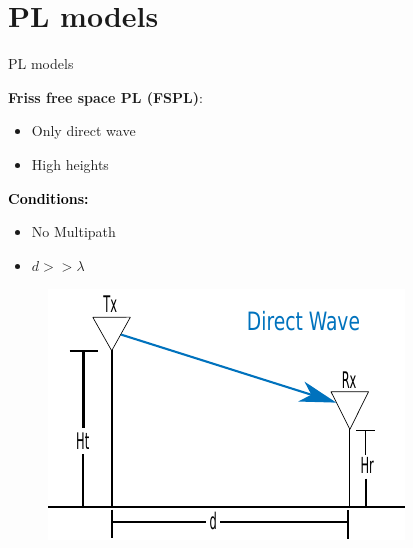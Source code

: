 \documentclass[10pt]{beamer}
\begin{document}
\section{PL models}
\begin{frame}{PL models}
\begin{minipage}{.45\textwidth}
\raggedright\textcolor{thomasblue}{\textbf{Friss free space PL (FSPL)}:}
\begin{itemize}
\item Only direct wave
\item High heights
\end{itemize} 

\vspace{1em}
\textcolor{black}{\textbf{Conditions:}}
\begin{itemize}
\item No Multipath
\item $d >> \lambda$
\end{itemize}

\end{minipage}
\begin{minipage}{0.5\textwidth}
\begin{figure}[!htbp]
 \centering
  \includegraphics[width = \columnwidth]{figures/friss_illu.pdf}
  \end{figure}
\end{minipage}
\end{frame}
\end{document}
